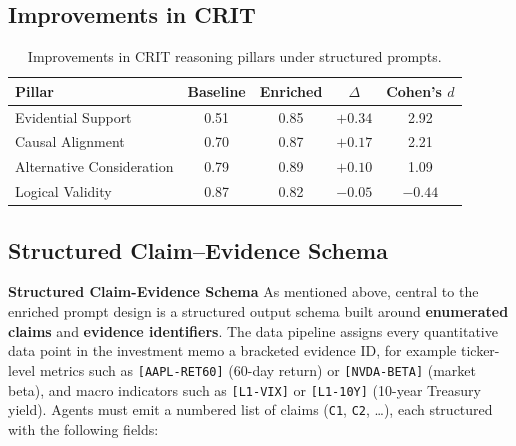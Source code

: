 \documentclass{article}
\begin{document}
\subsection{Improvements in CRIT}
\label{app:improvement_in_crit}
\begin{table}[H]
\centering
\small
\begin{tabular}{lcccc}
\toprule
\textbf{Pillar} & \textbf{Baseline} & \textbf{Enriched} & $\Delta$ & \textbf{Cohen's $d$} \\
\midrule
Evidential Support & 0.51 & 0.85 & $+0.34$ & 2.92 \\
Causal Alignment & 0.70 & 0.87 & $+0.17$ & 2.21 \\
Alternative Consideration & 0.79 & 0.89 & $+0.10$ & 1.09 \\
Logical Validity & 0.87 & 0.82 & $-0.05$ & $-0.44$ \\
\bottomrule
\end{tabular}
\vspace{4pt}
\caption{Improvements in CRIT reasoning pillars under structured prompts.}
\label{tab:crit_gains}
\end{table}


\subsection{Structured Claim--Evidence Schema}
\label{app:claim-schema}

\textbf{Structured Claim-Evidence Schema}
As mentioned above, central to the enriched prompt design is a structured output schema built around
\textbf{enumerated claims} and \textbf{evidence identifiers}. The data pipeline assigns every
quantitative data point in the investment memo a bracketed evidence ID, for example ticker-level metrics such
as \texttt{[AAPL-RET60]} (60-day return) or \texttt{[NVDA-BETA]} (market beta), and macro indicators
such as \texttt{[L1-VIX]} or \texttt{[L1-10Y]} (10-year Treasury yield). Agents must emit a numbered list of claims (\texttt{C1}, \texttt{C2}, \ldots), each structured with
the following fields:
\end{document}
